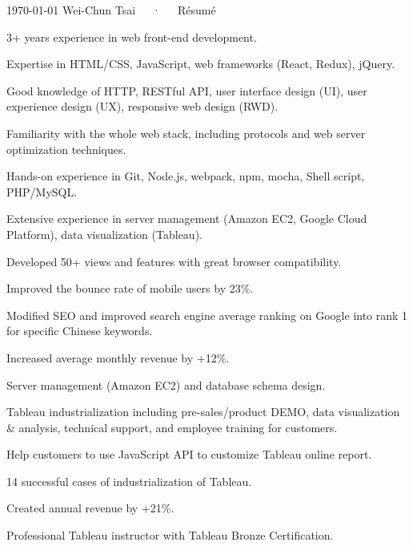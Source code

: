 \documentclass[10pt, a4paper]{puredoc-cv}
\begin{document}
\makecvtitle[C]

\makecvfooter
  {\today}
  {Wei-Chun Tsai~~~·~~~Résumé}
  {\thepage}

\begin{skipwrapper}
  \begin{cvitems}
    \item {3+ years experience in web front-end development.}
    \item {Expertise in HTML/CSS, JavaScript, web frameworks (React, Redux), jQuery.}
    \item {Good knowledge of HTTP, RESTful API, user interface design (UI), user experience design (UX), responsive web design (RWD).}
    \item {Familiarity with the whole web stack, including protocols and web server optimization techniques.}
    \item {Hands-on experience in Git, Node.js, webpack, npm, mocha, Shell script, PHP/MySQL.}
    \item {Extensive experience in server management (Amazon EC2, Google Cloud Platform), data visualization (Tableau).}
  \end{cvitems}
\end{skipwrapper}
\begin{skipwrapper}
  \begin{cvitems}
    \item {Developed 50+ views and features with great browser compatibility.}
    \item {Improved the bounce rate of mobile users by 23\%.}
    \item {Modified SEO and improved search engine average ranking on Google into rank 1 for specific Chinese keywords.}
    \item {Increased average monthly revenue by +12\%.}
    \item {Server management (Amazon EC2) and database schema design.}
  \end{cvitems}
\end{skipwrapper}
\begin{skipwrapper}
  \begin{cvitems}
    \item {Tableau industrialization including pre-sales/product DEMO, data visualization \& analysis, technical support, and employee training for customers.}
    \item {Help customers to use JavaScript API to customize Tableau online report.}
    \item {14 successful cases of industrialization of Tableau.}
    \item {Created annual revenue by +21\%.}
    \item {Professional Tableau instructor with Tableau Bronze Certification.}
  \end{cvitems}
\end{skipwrapper}
\end{document}
